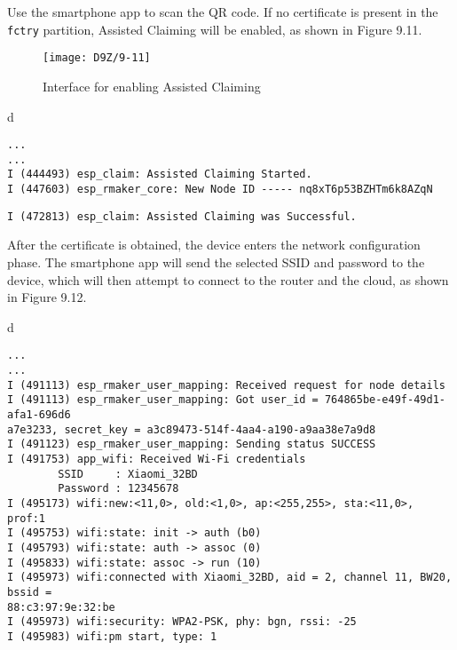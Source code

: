 \documentclass[a4paper,12pt]{book}
\begin{document}
Use the smartphone app to scan the QR code. If no certificate is present in the \verb|fctry| partition, Assisted Claiming will be enabled, as shown in Figure 9.11.

\begin{figure}[!h]
    \centering
    \texttt{[image: D9Z/9-11]}
    \caption{Interface for enabling Assisted Claiming}
\end{figure}

\begin{codebloc}
\begin{tabular}{d}
\vspace{2pt}
\begin{verbatim}
...
...
I (444493) esp_claim: Assisted Claiming Started.
I (447603) esp_rmaker_core: New Node ID ----- nq8xT6p53BZHTm6k8AZqN
\end{verbatim}
\verb|I (472813) esp_claim: Assisted Claiming was Successful.|
\end{tabular}
\end{codebloc}

After the certificate is obtained, the device enters the network configuration phase. The smartphone app will send the selected SSID and password to the device, which will then attempt to connect to the router and the cloud, as shown in Figure 9.12.

\begin{codebloc}
\begin{tabular}{d}
\vspace{2pt}
\begin{verbatim}
...
...
I (491113) esp_rmaker_user_mapping: Received request for node details
I (491113) esp_rmaker_user_mapping: Got user_id = 764865be-e49f-49d1-afa1-696d6
a7e3233, secret_key = a3c89473-514f-4aa4-a190-a9aa38e7a9d8
I (491123) esp_rmaker_user_mapping: Sending status SUCCESS
I (491753) app_wifi: Received Wi-Fi credentials
        SSID     : Xiaomi_32BD
        Password : 12345678
I (495173) wifi:new:<11,0>, old:<1,0>, ap:<255,255>, sta:<11,0>, prof:1
I (495753) wifi:state: init -> auth (b0)
I (495793) wifi:state: auth -> assoc (0)
I (495833) wifi:state: assoc -> run (10)
I (495973) wifi:connected with Xiaomi_32BD, aid = 2, channel 11, BW20, bssid = 
88:c3:97:9e:32:be
I (495973) wifi:security: WPA2-PSK, phy: bgn, rssi: -25
I (495983) wifi:pm start, type: 1
\end{verbatim}
\verb||
\end{tabular}
\end{codebloc}
\end{document}
